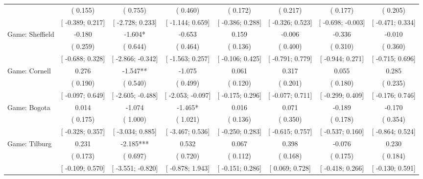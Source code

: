 \begin{tabular}{l*{7}{c}}
                    &(    0.155)   &(    0.755)   &(    0.460)   &(    0.172)   &(    0.217)   &(    0.177)   &(    0.205)   \\
                    &[   -0.389;     0.217]   &[   -2.728;     0.233]   &[   -1.144;     0.659]   &[   -0.386;     0.288]   &[   -0.326;     0.523]   &[   -0.698;    -0.003]   &[   -0.471;     0.334]   \\
Game: Sheffield &   -0.180   &   -1.604*   &   -0.653   &    0.159   &   -0.006   &   -0.336   &   -0.010   \\
                    &(    0.259)   &(    0.644)   &(    0.464)   &(    0.136)   &(    0.400)   &(    0.310)   &(    0.360)   \\
                    &[   -0.688;     0.328]   &[   -2.866;    -0.342]   &[   -1.563;     0.257]   &[   -0.106;     0.425]   &[   -0.791;     0.779]   &[   -0.944;     0.271]   &[   -0.715;     0.696]   \\
Game: Cornell &    0.276   &   -1.547**   &   -1.075   &    0.061   &    0.317   &    0.055   &    0.285   \\
                    &(    0.190)   &(    0.540)   &(    0.499)   &(    0.120)   &(    0.201)   &(    0.180)   &(    0.235)   \\
                    &[   -0.097;     0.649]   &[   -2.605;    -0.488]   &[   -2.053;    -0.097]   &[   -0.175;     0.296]   &[   -0.077;     0.711]   &[   -0.299;     0.409]   &[   -0.176;     0.746]   \\
Game: Bogota &    0.014   &   -1.074   &   -1.465*   &    0.016   &    0.071   &   -0.189   &   -0.170   \\
                    &(    0.175)   &(    1.000)   &(    1.021)   &(    0.136)   &(    0.350)   &(    0.178)   &(    0.354)   \\
                    &[   -0.328;     0.357]   &[   -3.034;     0.885]   &[   -3.467;     0.536]   &[   -0.250;     0.283]   &[   -0.615;     0.757]   &[   -0.537;     0.160]   &[   -0.864;     0.524]   \\
Game: Tilburg &    0.231   &   -2.185***   &    0.532   &    0.067   &    0.398   &   -0.076   &    0.230   \\
                    &(    0.173)   &(    0.697)   &(    0.720)   &(    0.112)   &(    0.168)   &(    0.175)   &(    0.184)   \\
                    &[   -0.109;     0.570]   &[   -3.551;    -0.820]   &[   -0.878;     1.943]   &[   -0.151;     0.286]   &[    0.069;     0.728]   &[   -0.418;     0.266]   &[   -0.130;     0.591]   \\

\end{tabular}
